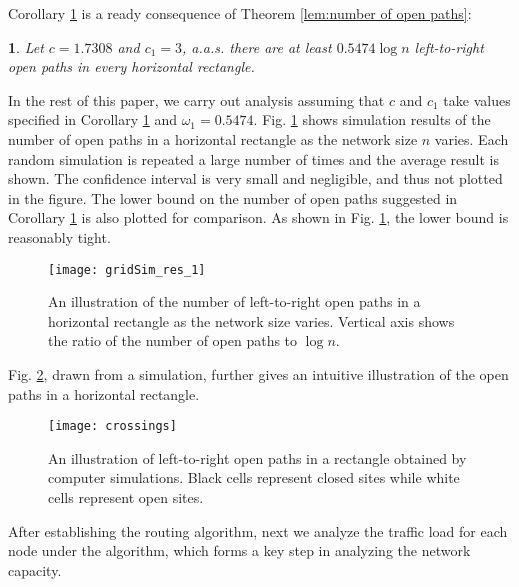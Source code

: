 \documentclass[english]{IEEEtran}
\theoremstyle{plain}
\theoremstyle{plain}
\newtheorem{cor}[thm]{\protect\corollaryname}
\theoremstyle{plain}
\theoremstyle{remark}
\providecommand{\corollaryname}{Corollary}
\begin{document}
Corollary \ref{cor:Number-Open-Paths} is a ready consequence of Theorem
\ref{lem:number of open paths}:
\begin{cor}
\label{cor:Number-Open-Paths}Let $c=1.7308$ and $c_{1}=3$, a.a.s.
there are at least $0.5474\log n$ left-to-right open paths in every
horizontal rectangle.
\end{cor}
In the rest of this paper, we carry out analysis assuming that $c$
and $c_{1}$ take values specified in Corollary \ref{cor:Number-Open-Paths}
and $\omega_{1}=0.5474$. Fig. \ref{fig:number of open paths} shows
simulation results of the number of open paths in a horizontal rectangle
as the network size $n$ varies. Each random simulation is repeated
a large number of times and the average result is shown. The confidence
interval is very small and negligible, and thus not plotted in the
figure. The lower bound on the number of open paths suggested in Corollary
\ref{cor:Number-Open-Paths} is also plotted for comparison. As shown
in Fig. \ref{fig:number of open paths}, the lower bound is reasonably
tight. 

\begin{figure}
\begin{centering}
\texttt{[image: gridSim\_res\_1]}
\par\end{centering}

\protect\caption{\label{fig:number of open paths}An illustration of the number of
left-to-right open paths in a horizontal rectangle as the network
size varies. Vertical axis shows the ratio of the number of open paths
to $\log n$.}
\end{figure}


Fig. \ref{fig:Open paths}, drawn from a simulation, further gives
an intuitive illustration of the open paths in a horizontal rectangle. 

\begin{figure}
\begin{centering}
\texttt{[image: crossings]}
\par\end{centering}

\protect\caption{\label{fig:Open paths}An illustration of left-to-right open paths
in a rectangle obtained by computer simulations. Black cells represent
closed sites while white cells represent open sites. }


\end{figure}


After establishing the routing algorithm, next we analyze the traffic
load for each node under the algorithm, which forms a key step in
analyzing the network capacity.
\end{document}
